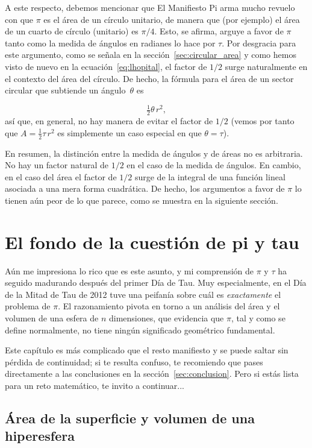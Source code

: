 A este respecto, debemos mencionar que El Manifiesto Pi arma mucho revuelo con que $\pi$ es el área de un círculo unitario, de manera que (por ejemplo) el área de un cuarto de círculo (unitario) es $\pi/4$. Esto, se afirma, arguye a favor de $\pi$ tanto como la medida de ángulos en radianes lo hace por $\tau$. Por desgracia para este argumento, como se señala en la sección~\ref{sec:circular_area} y como hemos visto de nuevo en la ecuación~\eqref{eq:lhopital}, el factor de $1/2$ surge naturalmente en el contexto del área del círculo. De hecho, la fórmula para el área de un sector circular que subtiende un ángulo~$\theta$ es

\[
\tfrac{1}{2}\theta\, r^2,
\]
así que, en general, no hay manera de evitar el factor de $1/2$ (vemos por tanto que $A = \frac{1}{2} \tau\, r^2$ es simplemente un caso especial en que  $\theta = \tau$).

En resumen, la distinción entre la medida de ángulos y de áreas no es arbitraria. No hay un factor natural de $1/2$ en el caso de la medida de ángulos. En cambio, en el caso del área el factor de $1/2$ surge de la integral de una función lineal asociada a una mera forma cuadrática. De hecho, los argumentos a favor de $\pi$ lo tienen aún peor de lo que parece, como se muestra en la siguiente sección.


\section{El fondo de la cuestión de pi y tau} %
\label{sec:getting_to_the_bottom_of_pi}

Aún me impresiona lo rico que es este asunto, y mi comprensión de $\pi$ y $\tau$ ha seguido madurando después del primer Día de Tau. Muy especialmente, en el Día de la Mitad de Tau de 2012 tuve una peifanía sobre cuál es \emph{exactamente} el problema de $\pi$. El razonamiento pivota en torno a un análisis del área y el volumen de una esfera de $n$ dimensiones, que evidencia que $\pi$, tal y como se define normalmente, no tiene ningún significado geométrico fundamental. 

Este capítulo es más complicado que el resto manifiesto y se puede saltar sin pérdida de continuidad; si te resulta confuso, te recomiendo que pases directamente a las conclusiones en la sección~\ref{sec:conclusion}. Pero si estás lista para un reto matemático, te invito a continuar...

  \subsection{Área de la superficie y volumen de una hiperesfera} %
  \label{sec:volume_of_a_hypersphere}

